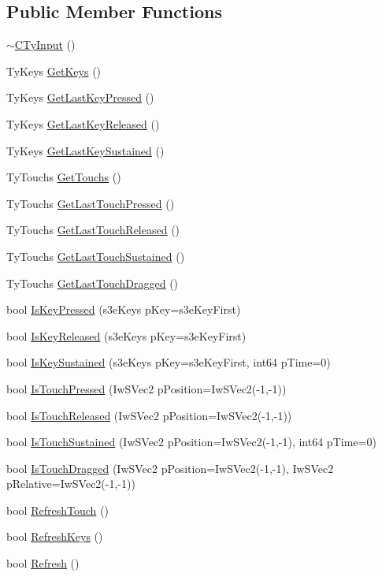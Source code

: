 \subsection*{Public Member Functions}
\begin{DoxyCompactItemize}
\item 
\hyperlink{class_c_ty_input_a15735035f972a1c75aaac87854c88689}{$\sim$CTyInput} ()
\item 
TyKeys \hyperlink{class_c_ty_input_af950c117d9af1c390a292d7f09c01c39}{GetKeys} ()
\item 
TyKeys \hyperlink{class_c_ty_input_aca57b482037aac8796f43877eb32e123}{GetLastKeyPressed} ()
\item 
TyKeys \hyperlink{class_c_ty_input_a586e588f6ff24b784d794f4af8ad82c8}{GetLastKeyReleased} ()
\item 
TyKeys \hyperlink{class_c_ty_input_a97c344e1a814a6b0589de0454e66b523}{GetLastKeySustained} ()
\item 
TyTouchs \hyperlink{class_c_ty_input_aa380ea7d7533d60afc9f61a905385f82}{GetTouchs} ()
\item 
TyTouchs \hyperlink{class_c_ty_input_a6ca3b5e9d6630fa6c2f3220486345698}{GetLastTouchPressed} ()
\item 
TyTouchs \hyperlink{class_c_ty_input_ac8d7e98a38975ec86e44af0a521ad2e5}{GetLastTouchReleased} ()
\item 
TyTouchs \hyperlink{class_c_ty_input_a0f30e16b11cc0987ea6728dcc8d64eb2}{GetLastTouchSustained} ()
\item 
TyTouchs \hyperlink{class_c_ty_input_adac34bd09df0ad0a9d3706c1f2800b2f}{GetLastTouchDragged} ()
\item 
bool \hyperlink{class_c_ty_input_a448eeaef68ed0e01c84181a0fd94a551}{IsKeyPressed} (s3eKeys pKey=s3eKeyFirst)
\item 
bool \hyperlink{class_c_ty_input_adfc3a59e297e24638404c800f37a45f4}{IsKeyReleased} (s3eKeys pKey=s3eKeyFirst)
\item 
bool \hyperlink{class_c_ty_input_a314e25f86baa086808b154b8cc32acd3}{IsKeySustained} (s3eKeys pKey=s3eKeyFirst, int64 pTime=0)
\item 
bool \hyperlink{class_c_ty_input_a62a31340f001663c6361776337caf93d}{IsTouchPressed} (IwSVec2 pPosition=IwSVec2(-\/1,-\/1))
\item 
bool \hyperlink{class_c_ty_input_a5e4a84bccc649b7e79114e225a20ff45}{IsTouchReleased} (IwSVec2 pPosition=IwSVec2(-\/1,-\/1))
\item 
bool \hyperlink{class_c_ty_input_ae7b135f64f4f07e063b80e4e37b77c05}{IsTouchSustained} (IwSVec2 pPosition=IwSVec2(-\/1,-\/1), int64 pTime=0)
\item 
bool \hyperlink{class_c_ty_input_af895caadf8517ae4056949d2a81298a2}{IsTouchDragged} (IwSVec2 pPosition=IwSVec2(-\/1,-\/1), IwSVec2 pRelative=IwSVec2(-\/1,-\/1))
\item 
bool \hyperlink{class_c_ty_input_a3d3dc1b1b3e2e84d068ce065e9cfa801}{RefreshTouch} ()
\item 
bool \hyperlink{class_c_ty_input_acbce0ad39bcc9ff2abfa90954780ca34}{RefreshKeys} ()
\item 
bool \hyperlink{class_c_ty_input_a2c427ccc4d23b6569a61401ac0c26cfb}{Refresh} ()
\end{DoxyCompactItemize}



